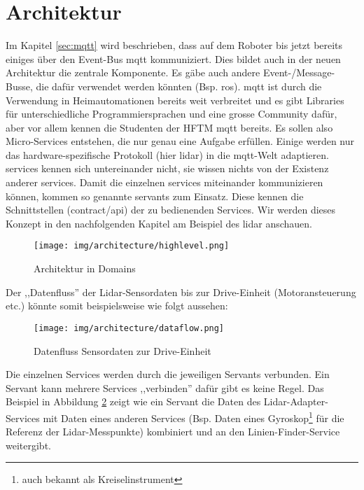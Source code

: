 \section{Architektur}
Im Kapitel \ref{sec:mqtt} wird beschrieben, dass auf dem Roboter bis jetzt bereits einiges über den Event-Bus \acrshort{mqtt} kommuniziert. Dies bildet auch in der neuen Architektur die zentrale Komponente. Es gäbe auch andere Event-/Message-Busse, die dafür verwendet werden könnten (Bsp. \acrshort{ros}). \acrshort{mqtt} ist durch die Verwendung in Heimautomationen bereits weit verbreitet und es gibt Libraries für unterschiedliche Programmiersprachen und eine grosse Community dafür, aber vor allem kennen die Studenten der HFTM \acrshort{mqtt} bereits. Es sollen also Micro-Services entstehen, die nur genau eine Aufgabe erfüllen. Einige werden nur das hardware-spezifische Protokoll (hier \acrshort{lidar}) in die \acrshort{mqtt}-Welt adaptieren. \Glspl{service} kennen sich untereinander nicht, sie wissen nichts von der Existenz anderer \glspl{service}. Damit die einzelnen \Glspl{service} miteinander kommunizieren können, kommen so genannte \Glspl{servant} zum Einsatz. Diese kennen die Schnittstellen (\gls{contract}/\acrshort{api}) der zu bedienenden Services. Wir werden dieses Konzept in den nachfolgenden Kapitel am Beispiel des \acrshort{lidar} anschauen.

\begin{figure}[H]
	\centering
	\texttt{[image: img/architecture/highlevel.png]}
	\caption{Architektur in Domains}
	\label{fig:architecture_highlevel}
\end{figure}

Der ,,Datenfluss'' der Lidar-Sensordaten bis zur Drive-Einheit (Motoransteuerung etc.) könnte somit beispielsweise wie folgt aussehen:
\begin{figure}[H]
	\centering
	\texttt{[image: img/architecture/dataflow.png]}
	\caption{Datenfluss Sensordaten zur Drive-Einheit}
	\label{fig:architecture_dataflow}
\end{figure}
Die einzelnen Services werden durch die jeweiligen Servants verbunden. Ein Servant kann mehrere Services ,,verbinden'' dafür gibt es keine Regel. Das Beispiel in Abbildung \ref{fig:architecture_dataflow} zeigt wie ein Servant die Daten des Lidar-Adapter-Services mit Daten eines anderen Services (Bsp. Daten eines Gyroskop\footnote{auch bekannt als Kreiselinstrument} für die Referenz der Lidar-Messpunkte)  kombiniert und an den Linien-Finder-Service weitergibt.



